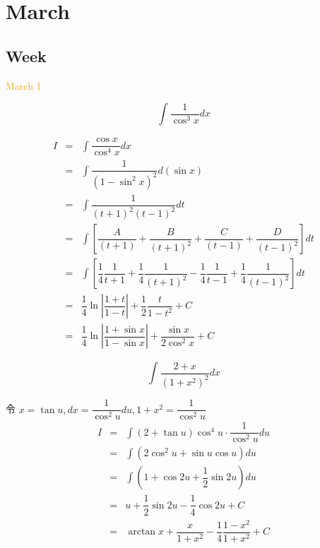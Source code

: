 \chapter{March}
\section{Week }
\textcolor{orange}{March 1}

\begin{example}[][Exam: 29.1.1]
	$$\int\dfrac{1}{\cos^{3} x}dx$$
\end{example}
\begin{solution}
	\begin{eqnarray*}
		I & = & \int \dfrac{\cos x}{\cos^{4} x}dx \\
		  & = & \int \dfrac{1}{(1-\sin^{2}x)^{2}}d(\sin x)\\
		  & = & \int \dfrac{1}{(t+1)^{2}(t-1)^{2}}dt\\
		  & = & \int \left[\dfrac{A}{(t+1)} + \dfrac{B}{(t+1)^{2}} + \dfrac{C}{(t-1)} + \dfrac{D}{(t-1)^{2}}\right]dt \\
		  & = & \int \left[\dfrac{1}{4}\dfrac{1}{t+1} + \dfrac{1}{4}\dfrac{1}{(t+1)^{2}} - \dfrac{1}{4}\dfrac{1}{t-1} + \dfrac{1}{4}\dfrac{1}{(t-1)^{2}}\right]dt\\
		  & = & \dfrac{1}{4}\ln\left|\dfrac{1+t}{1-t}\right| + \dfrac{1}{2}\dfrac{t}{1-t^{2}} + C\\
		  & = & \dfrac{1}{4}\ln\left|\dfrac{1+\sin x}{1-\sin x}\right| + \dfrac{\sin x}{2\cos^{2}x} + C
	\end{eqnarray*}
\end{solution}

\begin{example}[][Exam: 29.1.2]
	$$\int\dfrac{2+x}{(1+x^{2})^{2}}dx$$
\end{example}
\begin{solution}
	令 $x = \tan u, dx = \dfrac{1}{\cos^{2}u}du, 1+x^{2} = \dfrac{1}{\cos^{2}u}$
	\begin{eqnarray*}
		I & = & \int (2+\tan u)\cos^{4}u\cdot \dfrac{1}{\cos^{2}u}du\\
		  & = & \int (2\cos^{2}u+\sin u\cos u)du\\
		  & = & \int (1+\cos 2u + \dfrac{1}{2}\sin 2u)du\\
		  & = & u + \dfrac{1}{2}\sin 2u - \dfrac{1}{4}\cos 2u + C\\
		  & = & \arctan x + \dfrac{x}{1+x^{2}} - \dfrac{1}{4}\dfrac{1-x^{2}}{1+x^{2}} + C
	\end{eqnarray*}
\end{solution}

